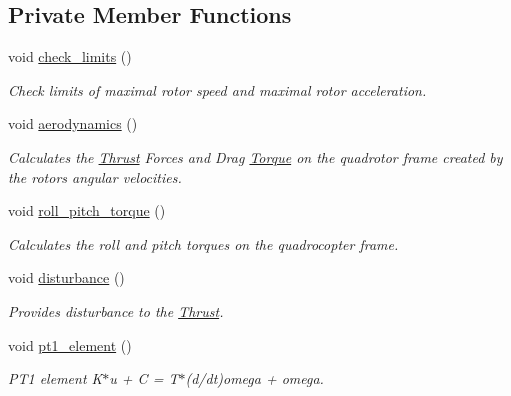 \subsection*{\-Private \-Member \-Functions}
\begin{DoxyCompactItemize}
\item 
void \hyperlink{classQuadRotorDynamics_a8c92658749a4850ff5926d580e418e7c}{check\-\_\-limits} ()
\begin{DoxyCompactList}\small\item\em \-Check limits of maximal rotor speed and maximal rotor acceleration. \end{DoxyCompactList}\item 
\hypertarget{classQuadRotorDynamics_a6af363905190ef448b961a70a5b0042a}{void \hyperlink{classQuadRotorDynamics_a6af363905190ef448b961a70a5b0042a}{aerodynamics} ()}\label{classQuadRotorDynamics_a6af363905190ef448b961a70a5b0042a}

\begin{DoxyCompactList}\small\item\em \-Calculates the \hyperlink{classThrust}{\-Thrust} \-Forces and \-Drag \hyperlink{classTorque}{\-Torque} on the quadrotor frame created by the rotors angular velocities. \end{DoxyCompactList}\item 
void \hyperlink{classQuadRotorDynamics_af7e8d034a94d648d9d6136e0540db630}{roll\-\_\-pitch\-\_\-torque} ()
\begin{DoxyCompactList}\small\item\em \-Calculates the roll and pitch torques on the quadrocopter frame. \end{DoxyCompactList}\item 
void \hyperlink{classQuadRotorDynamics_a78d2bfe2469d1fd447b486ebf6a3fd64}{disturbance} ()
\begin{DoxyCompactList}\small\item\em \-Provides disturbance to the \hyperlink{classThrust}{\-Thrust}. \end{DoxyCompactList}\item 
\hypertarget{classQuadRotorDynamics_a9755a314e2c4d7abc54135bb127b8d75}{void \hyperlink{classQuadRotorDynamics_a9755a314e2c4d7abc54135bb127b8d75}{pt1\-\_\-element} ()}\label{classQuadRotorDynamics_a9755a314e2c4d7abc54135bb127b8d75}

\begin{DoxyCompactList}\small\item\em \-P\-T1 element \-K$\ast$u + \-C = \-T$\ast$(d/dt)omega + omega. \end{DoxyCompactList}\end{DoxyCompactItemize}

